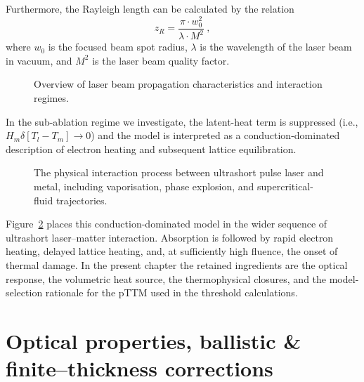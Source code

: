 \noindent
Furthermore, the Rayleigh length can be calculated by the relation
\begin{equation}
  z_R = \frac{\pi  \cdot w_0^2}{\lambda \cdot M^2} \ ,
\end{equation}
where $w_0$ is the focused beam spot radius, $\lambda$ is the wavelength of the laser beam in vacuum, and $M^2$ is the laser beam quality factor.

\begin{figure}[htbp]
  \centering
  \hfill
  \caption{Overview of laser beam propagation characteristics and interaction regimes.}
  \label{fig:ch1-rayleigh_length_axisymmetric_laser}
\end{figure}

In the sub-ablation regime we investigate, the latent-heat term is
suppressed (i.e., $H_m \delta [T_l - T_m] \rightarrow 0$) and the model is interpreted as a conduction-dominated description of electron
heating and subsequent lattice equilibration.

\begin{figure}[H]
  \centering
  \PublicFigureOmitted[0.85\linewidth]
  \caption{The physical interaction process between ultrashort pulse laser and metal, including vaporisation, phase explosion, and supercritical-fluid trajectories. \cite{Song_2023}}
  \label{fig:ch1-laser-induced-trajectories}
\end{figure}

Figure~\ref{fig:ch1-laser-induced-trajectories} places this conduction-dominated model in the wider sequence of ultrashort laser--matter interaction. Absorption is followed by rapid electron heating, delayed lattice heating, and, at sufficiently high fluence, the onset of thermal damage. In the present chapter the retained ingredients are the optical response, the volumetric heat source, the thermophysical closures, and the model-selection rationale for the pTTM used in the threshold calculations.

\section{Optical properties, ballistic \& finite--thickness corrections}
\label{sec:ch1-absorption}

